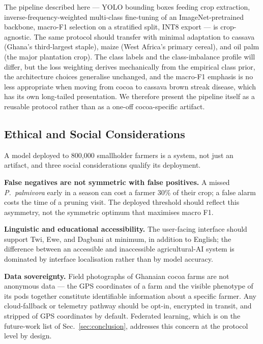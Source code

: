 \documentclass[conference,10pt]{IEEEtran}
\begin{document}
The pipeline described here — YOLO bounding boxes feeding crop extraction,
inverse-frequency-weighted multi-class fine-tuning of an ImageNet-pretrained
backbone, macro-F1 selection on a stratified split, INT8 export — is
crop-agnostic. The same protocol should transfer with minimal adaptation to
cassava (Ghana's third-largest staple), maize (West Africa's primary cereal),
and oil palm (the major plantation crop). The class labels and the
class-imbalance profile will differ, but the loss weighting derives
mechanically from the empirical class prior, the architecture choices
generalise unchanged, and the macro-F1 emphasis is no less appropriate when
moving from cocoa to cassava brown streak disease, which has its own
long-tailed presentation. We therefore present the pipeline itself as a
reusable protocol rather than as a one-off cocoa-specific artifact.

\subsection{Ethical and Social Considerations}

A model deployed to 800{,}000 smallholder farmers is a system, not just an
artifact, and three social considerations qualify its deployment.

\textbf{False negatives are not symmetric with false positives.} A missed
\textit{P.\ palmivora} early in a season can cost a farmer 30\% of their
crop; a false alarm costs the time of a pruning visit. The deployed
threshold should reflect this asymmetry, not the symmetric optimum that
maximises macro F1.

\textbf{Linguistic and educational accessibility.} The user-facing
interface should support Twi, Ewe, and Dagbani at minimum, in addition to
English; the difference between an accessible and inaccessible
agricultural-AI system is dominated by interface localisation rather than
by model accuracy.

\textbf{Data sovereignty.} Field photographs of Ghanaian cocoa farms are
not anonymous data — the GPS coordinates of a farm and the visible
phenotype of its pods together constitute identifiable information about
a specific farmer. Any cloud-fallback or telemetry pathway should be
opt-in, encrypted in transit, and stripped of GPS coordinates by default.
Federated learning, which is on the future-work list of
Sec.~\ref{sec:conclusion}, addresses this concern at the protocol level
by design.

\end{document}
